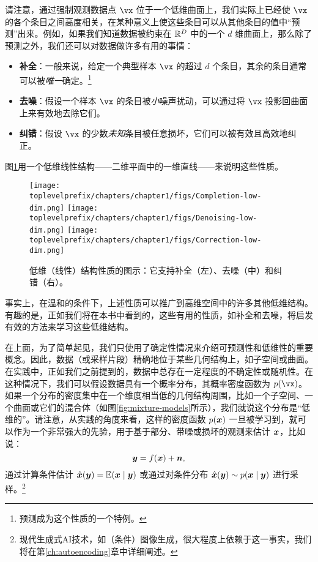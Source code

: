\documentclass[../../book-main.tex]{subfiles}
\begin{document}
请注意，通过强制观测数据点 $\vx$ 位于一个低维曲面上，我们实际上已经使 $\vx$ 的各个条目之间高度相关，在某种意义上使这些条目可以从其他条目的值中“预测”出来。例如，如果我们知道数据被约束在 $\mathbb{R}^D$ 中的一个 $d$ 维曲面上，那么除了预测之外，我们还可以对数据做许多有用的事情：%
\begin{itemize}
    \item \textbf{补全}：一般来说，给定一个典型样本 $\vx$ 的超过 $d$ 个条目，其余的条目通常可以被{\em 唯一}确定。\footnote{预测成为这个性质的一个特例。}
    \item \textbf{去噪}：假设一个样本 $\vx$ 的条目被{\em 小}噪声扰动，可以通过将 $\vx$ 投影回曲面上来有效地去除它们。
    \item \textbf{纠错}：假设 $\vx$ 的少数{\em 未知}条目被任意损坏，它们可以被有效且高效地纠正。
\end{itemize}
图\ref{fig:low-dim-properties}用一个低维线性结构——二维平面中的一维直线——来说明这些性质。

\begin{figure}
    \centering
    \texttt{[image: \\toplevelprefix/chapters/chapter1/figs/Completion-low-dim.png]}     \texttt{[image: \\toplevelprefix/chapters/chapter1/figs/Denoising-low-dim.png]} \texttt{[image: \\toplevelprefix/chapters/chapter1/figs/Correction-low-dim.png]} 
    \caption{低维（线性）结构性质的图示：它支持补全（左）、去噪（中）和纠错（右）。}
    \label{fig:low-dim-properties}
\end{figure}

事实上，在温和的条件下，上述性质可以推广到高维空间中的许多其他低维结构\cite{Wright-Ma-2022}。有趣的是，正如我们将在本书中看到的，这些有用的性质，如补全和去噪，将启发有效的方法来学习这些低维结构。

在上面，为了简单起见，我们只使用了确定性情况来介绍可预测性和低维性的重要概念。因此，数据（或采样片段）精确地位于某些几何结构上，如子空间或曲面。在实践中，正如我们之前提到的，数据中总存在一定程度的不确定性或随机性。在这种情况下，我们可以假设数据具有一个概率分布，其概率密度函数为 $p(\vx)$。如果一个分布的密度集中在一个维度相当低的几何结构周围，比如一个子空间、一个曲面或它们的混合体（如图\ref{fig:mixture-models}所示），我们就说这个分布是“低维的”。请注意，从实践的角度来看，这样的密度函数 $p(\bm{x})$ 一旦被学习到，就可以作为一个非常强大的先验，用于基于部分、带噪或损坏的观测来估计 $\bm{x}$，比如说：
\begin{equation}
\bm{y} = f(\bm{x}) + \boldsymbol{n},
\end{equation}
通过计算条件估计 $\hat{\bm{x}}(\bm{y}) = \mathbb{E}(\bm{x} \mid \bm{y})$ 或通过对条件分布 $\hat{\bm{x}}(\bm{y}) \sim p(\bm{x}\mid \bm{y})$ 进行采样。\footnote{现代生成式AI技术，如（条件）图像生成，很大程度上依赖于这一事实，我们将在第\ref{ch:autoencoding}章中详细阐述。}
\end{document}
